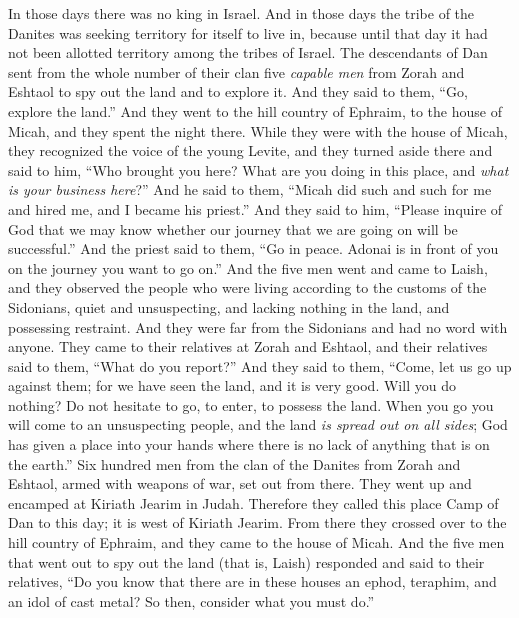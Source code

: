 \begin{biblechapter} %
 In those days there was no king in Israel. And in those days the tribe of the Danites was seeking territory for itself to live in, because until that day it had not been allotted territory among the tribes of Israel.
\verse The descendants of Dan sent from the whole number of their clan five \textit{capable men} from Zorah and Eshtaol to spy out the land and to explore it. And they said to them, “Go, explore the land.” And they went to the hill country of Ephraim, to the house of Micah, and they spent the night there.
\verse While they were with the house of Micah, they recognized the voice of the young Levite, and they turned aside there and said to him, “Who brought you here? What are you doing in this place, and \textit{what is your business here}?”
\verse And he said to them, “Micah did such and such for me and hired me, and I became his priest.”
\verse And they said to him, “Please inquire of God that we may know whether our journey that we are going on will be successful.”
\verse And the priest said to them, “Go in peace. Adonai is in front of you on the journey you want to go on.”
\verse And the five men went and came to Laish, and they observed the people who were living according to the customs of the Sidonians, quiet and unsuspecting, and lacking nothing in the land, and possessing restraint. And they were far from the Sidonians and had no word with anyone.
\verse They came to their relatives at Zorah and Eshtaol, and their relatives said to them, “What do you report?”
\verse And they said to them, “Come, let us go up against them; for we have seen the land, and it is very good. Will you do nothing? Do not hesitate to go, to enter, to possess the land.
\verse When you go you will come to an unsuspecting people, and the land \textit{is spread out on all sides}; God has given a place into your hands where there is no lack of anything that is on the earth.”
\verse Six hundred men from the clan of the Danites from Zorah and Eshtaol, armed with weapons of war, set out from there.
\verse They went up and encamped at Kiriath Jearim in Judah. Therefore they called this place Camp of Dan to this day; it is west of Kiriath Jearim.
\verse From there they crossed over to the hill country of Ephraim, and they came to the house of Micah.
\verse And the five men that went out to spy out the land (that is, Laish) responded and said to their relatives, “Do you know that there are in these houses an ephod, teraphim, and an idol of cast metal? So then, consider what you must do.”

\end{biblechapter}

